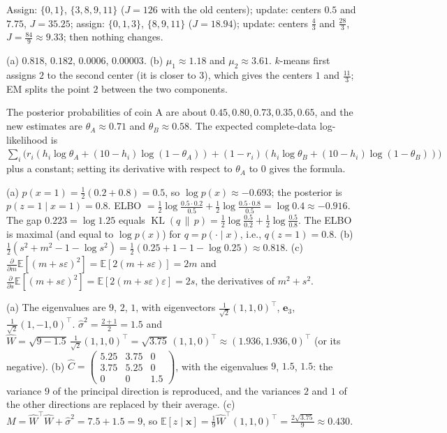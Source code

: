 \documentclass[11pt]{article}
\newcommand{\E}{\mathbb{E}}
\DeclareMathOperator{\KL}{KL}
\begin{document}
\begin{description}[leftmargin=0pt, itemsep=0.3em]
    \item[\ref{pr:kmeans-practice}.] Assign: $\{0, 1\}$, $\{3, 8, 9, 11\}$ ($J = 126$ with the old centers); update: centers $0.5$ and $7.75$, $J = 35.25$; assign: $\{0, 1, 3\}$, $\{8, 9, 11\}$ ($J = 18.94$); update: centers $\frac{4}{3}$ and $\frac{28}{3}$, $J = \frac{84}{9} \approx 9.33$; then nothing changes.
    \item[\ref{pr:em-practice}.] (a) $0.818$, $0.182$, $0.0006$, $0.00003$. (b) $\mu_1 \approx 1.18$ and $\mu_2 \approx 3.61$. $k$-means first assigns $2$ to the second center (it is closer to $3$), which gives the centers $1$ and $\frac{11}{3}$; EM splits the point $2$ between the two components.
    \item[\ref{pr:em-coins}.] The posterior probabilities of coin A are about $0.45, 0.80, 0.73, 0.35, 0.65$, and the new estimates are $\theta_A \approx 0.71$ and $\theta_B \approx 0.58$. The expected complete-data log-likelihood is $\sum_i \big(r_i(h_i\log\theta_A + (10 - h_i)\log(1 - \theta_A)) + (1 - r_i)(h_i\log\theta_B + (10 - h_i)\log(1 - \theta_B))\big)$ plus a constant; setting its derivative with respect to $\theta_A$ to $0$ gives the formula.
    \item[\ref{pr:elbo}.] (a) $p(x = 1) = \frac{1}{2}(0.2 + 0.8) = 0.5$, so $\log p(x) \approx -0.693$; the posterior is $p(z = 1 \mid x = 1) = 0.8$. ELBO $= \frac{1}{2}\log\frac{0.5 \cdot 0.2}{0.5} + \frac{1}{2}\log\frac{0.5 \cdot 0.8}{0.5} = \log 0.4 \approx -0.916$. The gap $0.223 = \log 1.25$ equals $\KL(q \,\|\, p) = \frac{1}{2}\log\frac{0.5}{0.2} + \frac{1}{2}\log\frac{0.5}{0.8}$. The ELBO is maximal (and equal to $\log p(x)$) for $q = p(\cdot \mid x)$, i.e., $q(z = 1) = 0.8$. (b) $\frac{1}{2}(s^2 + m^2 - 1 - \log s^2) = \frac{1}{2}(0.25 + 1 - 1 - \log 0.25) \approx 0.818$. (c) $\frac{\partial}{\partial m}\E[(m + s\varepsilon)^2] = \E[2(m + s\varepsilon)] = 2m$ and $\frac{\partial}{\partial s}\E[(m + s\varepsilon)^2] = \E[2(m + s\varepsilon)\varepsilon] = 2s$, the derivatives of $m^2 + s^2$.
\item[\ref{pr:ppca}.] (a) The eigenvalues are $9$, $2$, $1$, with eigenvectors $\frac{1}{\sqrt{2}}(1, 1, 0)^\top$, $\mathbf{e}_3$, $\frac{1}{\sqrt{2}}(1, -1, 0)^\top$. $\hat\sigma^2 = \frac{2 + 1}{2} = 1.5$ and $\hat W = \sqrt{9 - 1.5}\,\frac{1}{\sqrt{2}}(1, 1, 0)^\top = \sqrt{3.75}\,(1, 1, 0)^\top \approx (1.936, 1.936, 0)^\top$ (or its negative). (b) $\hat C = \begin{pmatrix} 5.25 & 3.75 & 0 \\ 3.75 & 5.25 & 0 \\ 0 & 0 & 1.5 \end{pmatrix}$, with the eigenvalues $9$, $1.5$, $1.5$: the variance $9$ of the principal direction is reproduced, and the variances $2$ and $1$ of the other directions are replaced by their average. (c) $M = \hat W^\top\hat W + \hat\sigma^2 = 7.5 + 1.5 = 9$, so $\E[z \mid \mathbf{x}] = \frac{1}{9}\hat W^\top(1, 1, 0)^\top = \frac{2\sqrt{3.75}}{9} \approx 0.430$.
\end{description}
\end{document}
